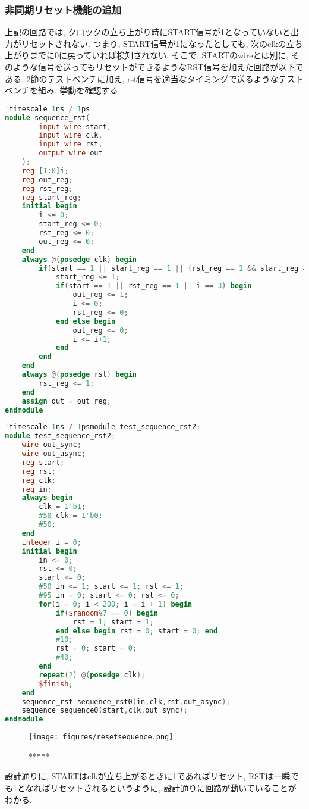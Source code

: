 \documentclass[titlepage]{ltjsarticle}
\begin{document}
\subsubsection{非同期リセット機能の追加}
上記の回路では, クロックの立ち上がり時にSTART信号が1となっていないと出力がリセットされない. つまり, START信号が1になったとしても, 次のclkの立ち上がりまでに0に戻っていれば検知されない. そこで, STARTのwireとは別に, そのような信号を送ってもリセットができるようなRST信号を加えた回路が以下である. 
2節のテストベンチに加え, rst信号を適当なタイミングで送るようなテストベンチを組み, 挙動を確認する. 
\begin{lstlisting}[caption=リセット付き順序回路デザイン,language=verilog]
'timescale 1ns / 1ps
module sequence_rst(
        input wire start,
        input wire clk,
        input wire rst,
        output wire out
    );
    reg [1:0]i;
    reg out_reg;
    reg rst_reg;
    reg start_reg;
    initial begin
        i <= 0;
        start_reg <= 0;
        rst_reg <= 0;
        out_reg <= 0;
    end
    always @(posedge clk) begin
        if(start == 1 || start_reg == 1 || (rst_reg == 1 && start_reg == 1)) begin
            start_reg <= 1;
            if(start == 1 || rst_reg == 1 || i == 3) begin
                out_reg <= 1;
                i <= 0;
                rst_reg <= 0;
            end else begin
                out_reg <= 0;
                i <= i+1;
            end
        end
    end
    always @(posedge rst) begin
        rst_reg <= 1;
    end
    assign out = out_reg;
endmodule
\end{lstlisting}
\begin{lstlisting}[caption=リセット付き順序回路テストベンチ,language=verilog]
'timescale 1ns / 1psmodule test_sequence_rst2;
module test_sequence_rst2;
    wire out_sync;
    wire out_async;
    reg start;
    reg rst;
    reg clk;
    reg in;
    always begin
        clk = 1'b1;
        #50 clk = 1'b0;
        #50;
    end
    integer i = 0;
    initial begin
        in <= 0;
        rst <= 0;
        start <= 0;
        #50 in <= 1; start <= 1; rst <= 1;
        #95 in = 0; start <= 0; rst <= 0;
        for(i = 0; i < 200; i = i + 1) begin
            if($random%7 == 0) begin
                rst = 1; start = 1;
            end else begin rst = 0; start = 0; end
            #10;
            rst = 0; start = 0;
            #40;
        end
        repeat(2) @(posedge clk);
        $finish;
    end
    sequence_rst sequence_rst0(in,clk,rst,out_async);
    sequence sequence0(start,clk,out_sync);
endmodule
\end{lstlisting}
\begin{figure}[H]
    \begin{center}
        \texttt{[image: figures/resetsequence.png]}
        \caption{*****}
    \end{center}
\end{figure}
設計通りに, STARTはclkが立ち上がるときに1であればリセット, RSTは一瞬でも1となればリセットされるというように, 設計通りに回路が動いていることがわかる. 
\end{document}
